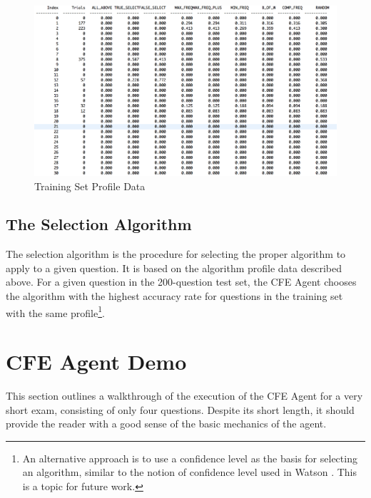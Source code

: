 \begin{figure}
\centering
\vspace{2.0in}
\includegraphics[scale=0.25]{profile_data_training_set.png}
\caption{Training Set Profile Data}
\label{fig:profile_data_training_set}
\end{figure}

\subsection{The Selection Algorithm}

The selection algorithm is the procedure for selecting the proper algorithm to apply to a given question.  It is based on the algorithm profile data described above.  For a given question in the 200-question test set, the CFE Agent chooses the algorithm with the highest accuracy rate for questions in the training set with the same profile\footnote{An alternative approach is to use a confidence level as the basis for selecting an algorithm, similar to the notion of confidence level used in Watson \cite{ferrucci2010building}.  This is a topic for future work.}.

\section{CFE Agent Demo}

This section outlines a walkthrough of the execution of the CFE Agent for a very short exam, consisting of only four questions.  Despite its short length, it should provide the reader with a good sense of the basic mechanics of the agent.  

